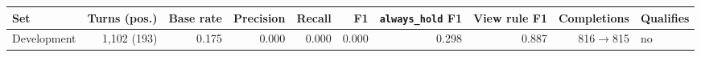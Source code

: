 \begin{tabular}{lrrrrrrrrl}
\toprule
Set & Turns (pos.) & Base rate & Precision & Recall & F1 & \texttt{always\_hold} F1 & View rule F1 & Completions & Qualifies \\
\midrule
Development & 1{,}102 (193) & 0.175 & 0.000 & 0.000 & 0.000 & 0.298 & 0.887 & 816$\to$815 & no \\
\bottomrule
\end{tabular}
